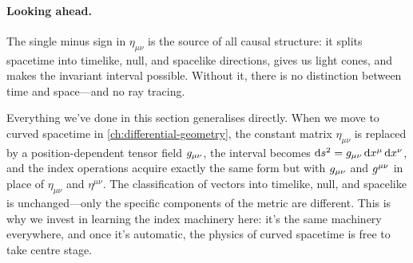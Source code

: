 \paragraph{Looking ahead.}

The single minus sign in $\eta_{\mu\nu}$ is the source of all causal
structure: it splits spacetime into timelike, null, and spacelike directions,
gives us light cones, and makes the invariant interval possible.  Without it,
there is no distinction between time and space---and no ray tracing.

Everything we've done in this section generalises directly.  When we move to
curved spacetime in \cref{ch:differential-geometry}, the constant matrix
$\eta_{\mu\nu}$ is replaced by a position-dependent tensor field $g_{\mu\nu}$,
the interval becomes $\mathrm{d} s^2 = g_{\mu\nu}\,\mathrm{d} x^\mu\,\mathrm{d} x^\nu$, and the index
operations acquire exactly the same form but with $g_{\mu\nu}$ and $g^{\mu\nu}$
in place of $\eta_{\mu\nu}$ and $\eta^{\mu\nu}$.  The classification of
vectors into timelike, null, and spacelike is unchanged---only the specific
components of the metric are different.  This is why we invest in learning the
index machinery here: it's the same machinery everywhere, and once it's
automatic, the physics of curved spacetime is free to take centre stage.
